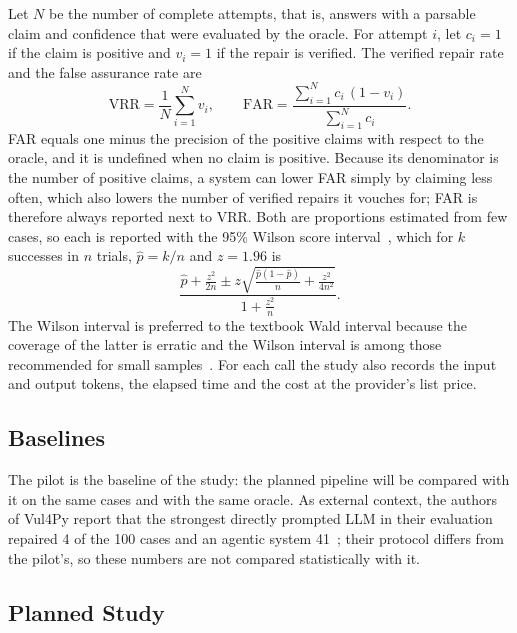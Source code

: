 \documentclass[ai,article,submit,oneauthor]{Definitions/mdpi}
\begin{document}
Let $N$ be the number of complete attempts, that is, answers with a parsable claim and confidence that were evaluated by the oracle. For attempt $i$, let $c_i=1$ if the claim is positive and $v_i=1$ if the repair is verified. The verified repair rate and the false assurance rate are
\begin{equation}
\mathrm{VRR}=\frac{1}{N}\sum_{i=1}^{N} v_i, \qquad
\mathrm{FAR}=\frac{\sum_{i=1}^{N} c_i\,(1-v_i)}{\sum_{i=1}^{N} c_i}.
\label{eq:metrics}
\end{equation}
FAR equals one minus the precision of the positive claims with respect to the oracle, and it is undefined when no claim is positive. Because its denominator is the number of positive claims, a system can lower FAR simply by claiming less often, which also lowers the number of verified repairs it vouches for; FAR is therefore always reported next to VRR. Both are proportions estimated from few cases, so each is reported with the 95\% Wilson score interval~\cite{Wilson1927ProbableInferenceLaw}, which for $k$ successes in $n$ trials, $\hat{p}=k/n$ and $z=1.96$ is
\begin{equation}
\frac{\hat{p}+\frac{z^{2}}{2n}\pm z\sqrt{\frac{\hat{p}(1-\hat{p})}{n}+\frac{z^{2}}{4n^{2}}}}{1+\frac{z^{2}}{n}}.
\label{eq:wilson}
\end{equation}
The Wilson interval is preferred to the textbook Wald interval because the coverage of the latter is erratic and the Wilson interval is among those recommended for small samples~\cite{Brown2001IntervalEstimationFor}. For each call the study also records the input and output tokens, the elapsed time and the cost at the provider's list price.

\subsection{Baselines}

The pilot is the baseline of the study: the planned pipeline will be compared with it on the same cases and with the same oracle. As external context, the authors of Vul4Py report that the strongest directly prompted LLM in their evaluation repaired 4 of the 100 cases and an agentic system 41~\cite{Bui2026Vul4pyBenchmarkingAutomated}; their protocol differs from the pilot's, so these numbers are not compared statistically with it.

\subsection{Planned Study}
\end{document}
